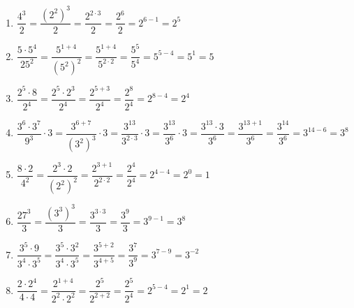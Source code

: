 \documentclass[a4paper,12pt]{report}
\begin{document}
\begin{Correction}
\begin{EXO}{}{}
\end{EXO}

\begin{EXO}{}{}

\begin{enumerate}[itemsep=2.5em]
\item $\dfrac{4^3}{2}=\dfrac{(2^2)^3}{2}=\dfrac{2^{2\cdot 3}}{2}=\dfrac{2^{6}}{2}=2^{6-1}=2^{5}$
\item $\dfrac{5\cdot 5^4}{25^2}=\dfrac{5^{1+4}}{(5^2)^2}=\dfrac{5^{1+4}}{5^{2 \cdot 2}}=\dfrac{5^{5}}{5^{4}}=5^{5-4}=5^{1}= 5$
\item $\dfrac{2^5\cdot 8}{2^4} = \dfrac{2^5\cdot 2^3}{2^4} = \dfrac{2^{5+3}}{2^4} = \dfrac{2^{8}}{2^4} = 2^{8-4} = 2^{4}$
\item $\dfrac{3^6\cdot 3^7}{9^3}\cdot 3=\dfrac{3^{6+7}}{(3^2)^3}\cdot 3=\dfrac{3^{13}}{3^{2\cdot 3}}\cdot 3=\dfrac{3^{13}}{3^{6}}\cdot 3=\dfrac{3^{13}\cdot 3}{3^{6}}=\dfrac{3^{13+1}}{3^{6}}=\dfrac{3^{14}}{3^{6}}=3^{14-6}=3^{8}$
\item $\dfrac{8\cdot 2}{4^2}=\dfrac{2^3\cdot 2}{(2^2)^2}=\dfrac{2^{3+1}}{2^{2\cdot2}}=\dfrac{2^{4}}{2^{4}}=2^{4-4}=2^{0}= 1$
\item $\dfrac{27^3}{3}=\dfrac{(3^3)^3}{3}=\dfrac{3^{3\cdot 3}}{3}=\dfrac{3^{9}}{3}=3^{9-1}=3^{8}$
\item $\dfrac{3^5\cdot 9}{3^4 \cdot 3^5} = \dfrac{3^5\cdot 3^{2}}{3^4 \cdot 3^5} = \dfrac{3^{5+2}}{3^{4+5}} = \dfrac{3^{7}}{3^{9}} = 3^{7-9} = 3^{-2}$
\item $\dfrac{2\cdot 2^4}{4\cdot 4}=\dfrac{2^{1+4}}{2^2\cdot 2^2}=\dfrac{2^{5}}{2^{2+2}}=\dfrac{2^{5}}{2^{4}}=2^{5-4}=2^{1}= 2$
\end{enumerate}

\end{EXO}

\begin{EXO}{}{}


\end{EXO}
\end{Correction}
\end{document}
